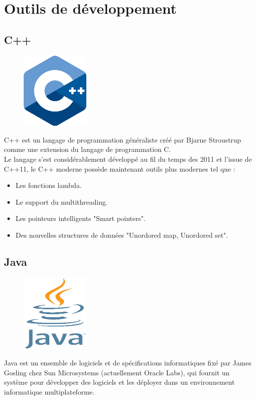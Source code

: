 \chapter{Outils de développement}
\section{C++}
\begin{figure}[H]  
 \centering
    \includegraphics[width=0.3\textwidth]{annexe/Figures/cpp_logo.png}
\end{figure}
C++ est un langage de programmation généraliste créé par Bjarne Stroustrup comme une extension du langage de programmation C.\\
Le langage s'est considérablement développé au fil du temps des 2011 et l’issue de C++11, le C++ moderne possède maintenant outils plus modernes tel que : 

\begin{itemize}[label=\textbullet]
\item Les fonctions lambda.
\item Le support du multithreading.
\item Les pointeurs intelligents "Smart pointers".
\item Des nouvelles structures de données "Unordored map, Unordored set".
\end{itemize}

\section{Java}
\begin{figure}[H]  
 \centering
    \includegraphics[width=0.3\textwidth]{annexe/Figures/java_logo.png}
\end{figure}
Java est un ensemble de logiciels et de spécifications informatiques fixé par James Gosling chez Sun Microsystems (actuellement Oracle Labs), qui fournit un système pour développer des logiciels et les déployer dans un environnement informatique multiplateforme.

